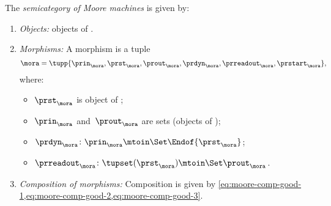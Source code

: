 \begin{definition}[\Moore]
    \label{def:Moore}
    The \emph{semicategory of Moore machines} \Moore is given by:
    \begin{enumerate}
        \item \emph{Objects:} objects of \SetL.
        \item \emph{Morphisms:}
              A morphism is a tuple
              \begin{equation}
                  \mora = \tupp{\prin_{\mora},\prst_{\mora},\prout_{\mora},\prdyn_{\mora},\prreadout_{\mora},\prstart_{\mora}},
              \end{equation}
              where:
              \begin{itemize}
                  \item $\prst_{\mora}$ is object of \SetL;
                  \item $\prin_{\mora}$ and~$\prout_{\mora}$ are sets (objects of \Set);
                  \item $ \prdyn_{\mora} \colon \prin_{\mora} \mtoin\Set  \Endof{\prst_{\mora}}$;
                  \item $ \prreadout_{\mora} \colon \tupset(\prst_{\mora})  \mtoin\Set \prout_{\mora}$.
              \end{itemize}
        \item \emph{Composition of morphisms:}
              Composition is given by \cref{eq:moore-comp-good-1,eq:moore-comp-good-2,eq:moore-comp-good-3}.
    \end{enumerate}
\end{definition}

